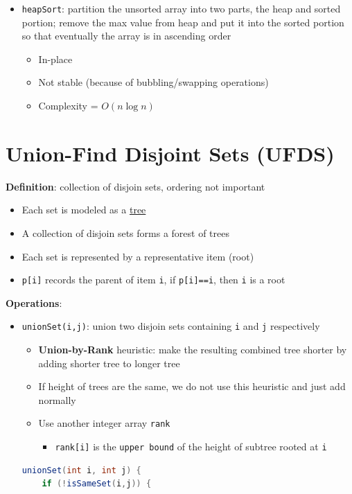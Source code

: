 \documentclass{article}
\begin{document}
\begin{multicols}{2}
\begin{itemize}
	\item \texttt{heapSort}: partition the unsorted array into two parts, the heap and sorted portion; remove the max value from heap and put it into the sorted portion so that eventually the array is in ascending order
	\begin{itemize}
		\item In-place
		\item Not stable (because of bubbling/swapping operations)
		\item Complexity = $O(n\log n)$
	\end{itemize}
\end{itemize}

\section{Union-Find Disjoint Sets (UFDS)}
\textbf{Definition}: collection of disjoin sets, ordering not important
\begin{itemize}
	\item Each set is modeled as a \underline{tree}
	\item A collection of disjoin sets forms a forest of trees
	\item Each set is represented by a representative item (root)
	\item \texttt{p[i]} records the parent of item \texttt{i}, if \texttt{p[i]==i}, then \texttt{i} is a root
\end{itemize}
\textbf{Operations}:
\begin{itemize}
	\item \texttt{unionSet(i,j)}: union two disjoin sets containing \texttt{i} and \texttt{j} respectively
	\begin{itemize}
		\item \textbf{Union-by-Rank} heuristic: make the resulting combined tree shorter by adding shorter tree to longer tree
		\item If height of trees are the same, we do not use this heuristic and just add normally
		\item Use another integer array \texttt{rank}
		\begin{itemize}
			\item \texttt{rank[i]} is the \texttt{upper bound} of the height of subtree rooted at \texttt{i}
		\end{itemize}
	\end{itemize}
    \begin{lstlisting}[language=Java]
unionSet(int i, int j) {
	if (!isSameSet(i,j)) {

\end{lstlisting}
\end{itemize}
\end{multicols}
\end{document}
